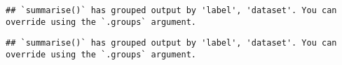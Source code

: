 \documentclass[
]{article}
\newenvironment{Shaded}{\begin{snugshade}}{\end{snugshade}}
\newcommand{\DataTypeTok}[1]{\textcolor[rgb]{0.13,0.29,0.53}{#1}}
\newcommand{\KeywordTok}[1]{\textcolor[rgb]{0.13,0.29,0.53}{\textbf{#1}}}
\newcommand{\NormalTok}[1]{#1}
\newcommand{\OperatorTok}[1]{\textcolor[rgb]{0.81,0.36,0.00}{\textbf{#1}}}
\newcommand{\StringTok}[1]{\textcolor[rgb]{0.31,0.60,0.02}{#1}}
\begin{document}
\begin{verbatim}
## `summarise()` has grouped output by 'label', 'dataset'. You can override using the `.groups` argument.
\end{verbatim}

\begin{Shaded}
\end{Shaded}

\begin{verbatim}
## `summarise()` has grouped output by 'label', 'dataset'. You can override using the `.groups` argument.
\end{verbatim}
\end{document}

